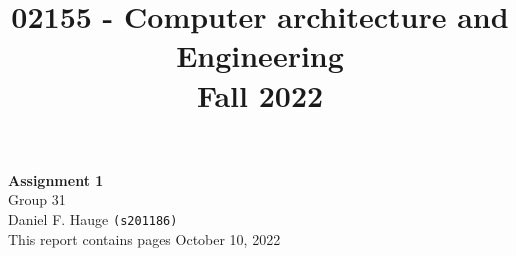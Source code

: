 \documentclass[a4paper]{article}
\begin{document}
\title{02155 - Computer architecture and Engineering\\Fall 2022}
\author{
}
\date{} %
\color{black}
\maketitle

\begin{center}
    { \huge \bfseries Assignment 1}\\
    
    \vspace{1.25cm}
    Group 31\\
    \vspace{.25cm}
    Daniel F. Hauge \texttt{(s201186)}\\
    
    \vspace{6cm}
    This report contains \pageref{LastPage} pages
    \vspace{.25cm}
    \vfill
    October 10, 2022
\end{center}


\medskip
\newpage


\end{document}
